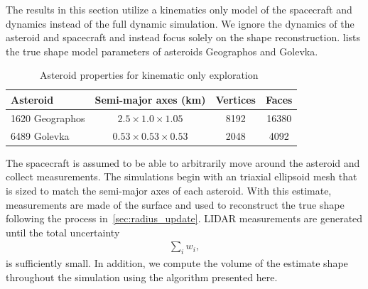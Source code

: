 \documentclass[journal]{new-aiaa}
\begin{document}
The results in this section utilize a kinematics only model of the spacecraft and dynamics instead of the full dynamic simulation. 
We ignore the dynamics of the asteroid and spacecraft and instead focus solely on the shape reconstruction.
 lists the true shape model parameters of asteroids Geographos and Golevka.
\begin{table}[htbp]
    \centering
    \begin{tabular}{lccc}
        \toprule
        Asteroid & Semi-major axes (\si{\kilo\meter}) & Vertices & Faces\\
        \midrule
        \num{1620} Geographos & \( 2.5 \times 1.0 \times 1.05 \) & \num{8192} & \num{16380}  \\
        \num{6489} Golevka & \( 0.53 \times 0.53 \times 0.53 \)  & \num{2048} & \num{4092} \\
        \bottomrule
    \end{tabular} 
    \caption{Asteroid properties for kinematic only exploration~\label{tab:kinematic_asteroids}}
\end{table}
The spacecraft is assumed to be able to arbitrarily move around the asteroid and collect measurements.
The simulations begin with an triaxial ellipsoid mesh that is sized to match the semi-major axes of each asteroid.
With this estimate, measurements are made of the surface and used to reconstruct the true shape following the process in~\cref{sec:radius_update}.
LIDAR measurements are generated until the total uncertainty
\begin{align*}
    \sum_i w_i,
\end{align*}
is sufficiently small.
In addition, we compute the volume of the estimate shape throughout the simulation using the algorithm presented here. 
\end{document}
